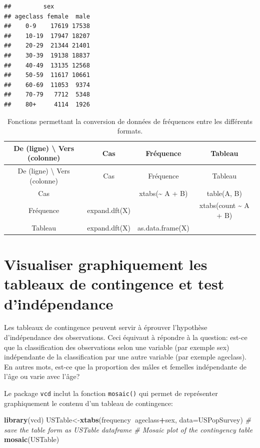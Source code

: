 \documentclass[12pt,]{book}
\newenvironment{Shaded}{\begin{snugshade}}{\end{snugshade}}
\newcommand{\CommentTok}[1]{\textcolor[rgb]{0.56,0.35,0.01}{\textit{#1}}}
\newcommand{\DataTypeTok}[1]{\textcolor[rgb]{0.13,0.29,0.53}{#1}}
\newcommand{\KeywordTok}[1]{\textcolor[rgb]{0.13,0.29,0.53}{\textbf{#1}}}
\newcommand{\NormalTok}[1]{#1}
\newcommand{\OperatorTok}[1]{\textcolor[rgb]{0.81,0.36,0.00}{\textbf{#1}}}
\begin{document}
\begin{verbatim}
##         sex
## ageclass female  male
##    0-9    17619 17538
##    10-19  17947 18207
##    20-29  21344 21401
##    30-39  19138 18837
##    40-49  13135 12568
##    50-59  11617 10661
##    60-69  11053  9374
##    70-79   7712  5348
##    80+     4114  1926
\end{verbatim}

\begin{longtable}[]{@{}cccc@{}}
\caption{\label{tab:unnamed-chunk-1}Fonctions permettant la conversion de données de fréquences entre les différents formats.}\tabularnewline
\toprule
De (ligne) \textbackslash{} Vers (colonne) & Cas & Fréquence & Tableau\tabularnewline
\midrule
\endfirsthead
\toprule
De (ligne) \textbackslash{} Vers (colonne) & Cas & Fréquence & Tableau\tabularnewline
\midrule
\endhead
Cas & & xtabs(\textasciitilde{} A + B) & table(A, B)\tabularnewline
Fréquence & expand.dft(X) & & xtabs(count \textasciitilde{} A + B)\tabularnewline
Tableau & expand.dft(X) & as.data.frame(X) &\tabularnewline
\bottomrule
\end{longtable}

\hypertarget{visualiser-graphiquement-les-tableaux-de-contingence-et-test-dinduxe9pendance}{%
\section{Visualiser graphiquement les tableaux de contingence et test d'indépendance}\label{visualiser-graphiquement-les-tableaux-de-contingence-et-test-dinduxe9pendance}}

Les tableaux de contingence peuvent servir à éprouver l'hypothèse d'indépendance des observations. Ceci équivaut à répondre à la question: est-ce que la classification des observations selon une variable (par exemple sex) indépendante de la classification par une autre variable (par exemple ageclass). En autres mots, est-ce que la proportion des mâles et femelles indépendante de l'âge ou varie avec l'âge?

Le package \texttt{vcd} inclut la fonction \texttt{mosaic()} qui permet de représenter graphiquement le contenu d'un tableau de contingence:

\begin{Shaded}
\begin{Highlighting}[]
\KeywordTok{library}\NormalTok{(vcd)}
\NormalTok{USTable<-}\KeywordTok{xtabs}\NormalTok{(frequency}\OperatorTok{~}\NormalTok{ageclass}\OperatorTok{+}\NormalTok{sex, }\DataTypeTok{data=}\NormalTok{USPopSurvey) }\CommentTok{# save the table form as USTable dataframe}
\CommentTok{# Mosaic plot of the contingency table}
\KeywordTok{mosaic}\NormalTok{(USTable)}
\end{Highlighting}
\end{Shaded}
\end{document}
